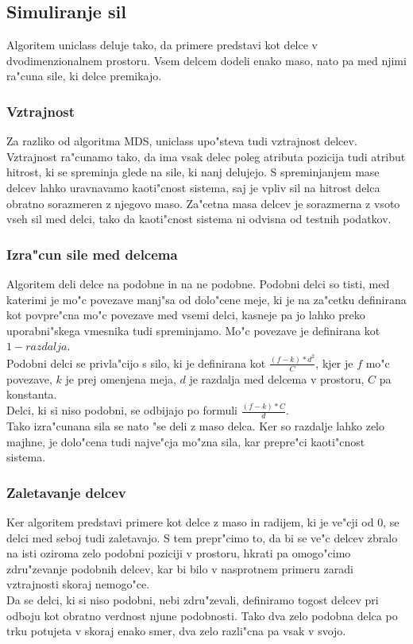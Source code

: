 \documentclass[a4paper]{article}
\begin{document}
	\subsection{Simuliranje sil}
		Algoritem uniclass deluje tako, da primere predstavi kot delce v dvodimenzionalnem prostoru. Vsem delcem dodeli enako maso, nato pa med njimi ra"cuna sile, ki delce premikajo.
		\subsubsection{Vztrajnost}
			Za razliko od algoritma MDS, uniclass upo"steva tudi vztrajnost delcev. Vztrajnost ra"cunamo tako, da ima vsak delec poleg atributa pozicija tudi atribut hitrost, ki se spreminja glede na sile, ki nanj delujejo. S spreminjanjem mase delcev lahko uravnavamo kaoti"cnost sistema, saj je vpliv sil na hitrost delca obratno sorazmeren z njegovo maso. Za"cetna masa delcev je sorazmerna z vsoto vseh sil med delci, tako da kaoti"cnost sistema ni odvisna od testnih podatkov.
		\subsubsection{Izra"cun sile med delcema}
			Algoritem deli delce na podobne in na ne podobne. Podobni delci so tisti, med katerimi je mo"c povezave manj"sa od dolo"cene meje, ki je na za"cetku definirana kot povpre"cna mo"c povezave med vsemi delci, kasneje pa jo lahko preko uporabni"skega vmesnika tudi spreminjamo. Mo"c povezave je definirana kot $ 1 - razdalja $.\\
			Podobni delci se privla"cijo s silo, ki je definirana kot $ \frac{(f - k) * d^2}{C} $, kjer je $f$ mo"c povezave, $k$ je prej omenjena meja, $d$ je razdalja med delcema v prostoru, $C$ pa konstanta. \\
			Delci, ki si niso podobni, se odbijajo po formuli $ \frac{(f - k) * C}{d} $.\\
			Tako izra"cunana sila se nato "se deli z maso delca. Ker so razdalje lahko zelo majhne, je dolo"cena tudi najve"cja mo"zna sila, kar prepre"ci kaoti"cnost sistema.
		\subsubsection{Zaletavanje delcev}
			Ker algoritem predstavi primere kot delce z maso in radijem, ki je ve"cji od 0, se delci med seboj tudi zaletavajo. S tem prepr"cimo to, da bi se ve"c delcev zbralo na isti oziroma zelo podobni poziciji v prostoru, hkrati pa omogo"cimo zdru"zevanje podobnih delcev, kar bi bilo v nasprotnem primeru zaradi vztrajnosti skoraj nemogo"ce.\\
			Da se delci, ki si niso podobni, nebi zdru"zevali, definiramo togost delcev pri odboju kot obratno verdnost njune podobnosti. Tako dva zelo podobna delca po trku potujeta v skoraj enako smer, dva zelo razli"cna pa vsak v svojo.
\end{document}
